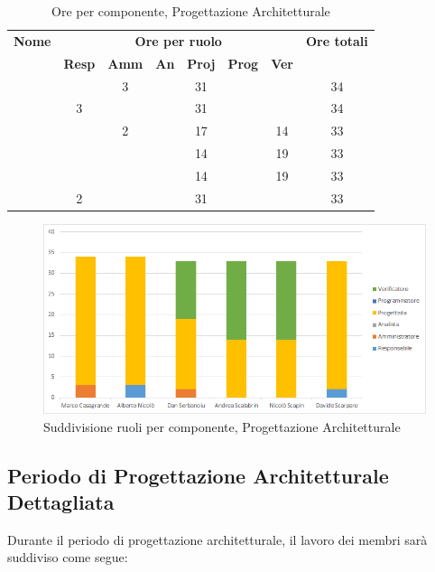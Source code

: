 \begin{table}[H]
	\begin{center}
		\begin{tabular}{|c|c|c|c|c|c|c|c|}
			\hline
			\textbf{Nome} & \multicolumn{6}{c|}{\textbf{Ore per ruolo}} & \textbf{Ore totali} \\\cline{2-7}
			& \textbf{Resp} & \textbf{Amm} & \textbf{An} & \textbf{Proj} & \textbf{Prog} & \textbf{Ver} & \\
			\hline
			\MC			&		&	3	&		&	31	&		&		&   34	\\
			\hline
			\AN			&	3	&		&		&	31	&		&		& 	34	\\
			\hline
			\DAN		&		&	2	&		&	17	&		&	14	&	33	\\
			\hline
			\AS			&		&	 	&	 	&	14	&	 	& 	19	&	33	\\
			\hline
			\NS 		&		&		&		&	14	&		& 	19	&	33	\\
			\hline
			\DS			& 	2	&		&		&	31	&		&		&	33	\\
			\hline
		\end{tabular}
	\end{center}
	\caption{Ore per componente, Progettazione Architetturale}
\end{table}

\begin{figure}[H]
	\centering
	\includegraphics[scale=0.6]{img/6-2.png}
	\caption{Suddivisione ruoli per componente, Progettazione Architetturale}
\end{figure}

\subsection{Periodo di Progettazione Architetturale Dettagliata}
Durante il periodo di progettazione architetturale, il lavoro dei membri sarà suddiviso come segue:


